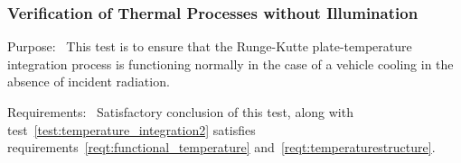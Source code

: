   \subsubsection{Verification of Thermal Processes without Illumination}
  \label{test:temperature_integration1}
  \begin{description}
  \item{Purpose:}\ \newline
    This test is to ensure that the Runge-Kutte plate-temperature integration
    process is functioning normally in the case of a vehicle cooling in the
    absence of incident radiation.
  \item{Requirements:}\ \newline
    Satisfactory conclusion of this test, along with test~\ref{test:temperature_integration2} satisfies requirements~\ref{reqt:functional_temperature} and~\ref{reqt:temperaturestructure}.


\end{description}
